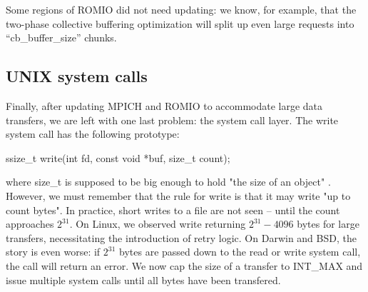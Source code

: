 Some regions of ROMIO did not need updating: we know, for example, that the
two-phase collective buffering optimization will split up even large requests
into ``cb\_buffer\_size'' chunks.

\subsection{UNIX system calls}

Finally, after updating MPICH and ROMIO to accommodate large data transfers,
 we are left
with one last problem: the system call layer.  The write system call has the
following prototype:

\begin{code}
ssize_t write(int fd, const void *buf, size_t count);
\end{code}

where size\_t is supposed to be big enough to hold "the size of an object"
\cite{posix-std}.  However, we must remember that the rule for write is that it may
write "up to count bytes".  In practice, short writes to a file are not seen --
until the count approaches $2^31$.  On Linux, we observed write returning
$2^31-4096$ bytes for large transfers, necessitating the introduction of retry
logic.  On Darwin and BSD, the story is even worse: if $2^31$ bytes are passed
down to the read or write system call, the call will return an error.  We now
cap the size of a transfer to INT\_MAX and issue multiple system calls until
all bytes have been transfered.
